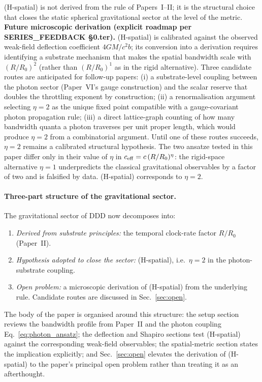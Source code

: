 \documentclass[11pt,a4paper]{article}
\begin{document}
(H-spatial) is not derived from the rule of Papers~I--II; it is
the structural choice that closes the static spherical
gravitational sector at the level of the metric.
\textbf{Future microscopic derivation (explicit roadmap per
SERIES\_FEEDBACK §0.ter).} (H-spatial) is calibrated against
the observed weak-field deflection coefficient $4GM/c^2 b$;
its conversion into a derivation requires identifying a
substrate mechanism that makes the spatial bandwidth scale
with $(R/R_0)^2$ (rather than $(R/R_0)^1$ as in the rigid
alternative). Three candidate routes are anticipated for
follow-up papers: (i) a substrate-level coupling between the
photon sector (Paper~VI's gauge construction) and the scalar
reserve that doubles the throttling exponent by construction;
(ii) a renormalisation argument selecting $\eta = 2$ as the
unique fixed point compatible with a gauge-covariant photon
propagation rule; (iii) a direct lattice-graph counting of
how many bandwidth quanta a photon traverses per unit
proper length, which would produce $\eta = 2$ from a
combinatorial argument. Until one of these routes succeeds,
$\eta = 2$ remains a calibrated structural hypothesis. The two
ansatze tested in this paper differ only in their value of
$\eta$ in $c_{\rm eff} = c\,(R/R_0)^\eta$: the rigid-space
alternative $\eta = 1$ underpredicts the classical
gravitational observables by a factor of two and is falsified
by data. (H-spatial) corresponds to $\eta = 2$.

\paragraph{Three-part structure of the gravitational sector.}
The gravitational sector of DDD now decomposes into:
\begin{enumerate}
\item \emph{Derived from substrate principles:} the temporal
clock-rate factor $R/R_0$ (Paper~II).
\item \emph{Hypothesis adopted to close the sector:} (H-spatial),
i.e.\ $\eta = 2$ in the photon-substrate coupling.
\item \emph{Open problem:} a microscopic derivation of
(H-spatial) from the underlying rule. Candidate routes are
discussed in Sec.~\ref{sec:open}.
\end{enumerate}

The body of the paper is organised around this structure:
the setup section reviews the bandwidth profile from
Paper~II and the photon coupling Eq.~\eqref{eq:photon_ansatz};
the deflection and Shapiro sections test (H-spatial) against
the corresponding weak-field observables;
the spatial-metric section states the implication explicitly;
and Sec.~\ref{sec:open} elevates the derivation of (H-spatial)
to the paper's principal open problem rather than treating it
as an afterthought.
\end{document}
